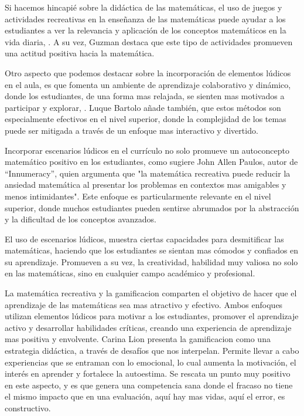 Si hacemos hincapié sobre la didáctica de las matemáticas, el uso de juegos y actividades recreativas en la enseñanza de las matemáticas puede ayudar a los estudiantes a ver la relevancia y aplicación de los conceptos matemáticos en la vida diaria, \textcite{guzman2000}. A su vez, Guzman destaca que este tipo de actividades promueven una actitud positiva hacia la matemática.

Otro aspecto que podemos destacar sobre la incorporación de elementos lúdicos en el aula, es que fomenta un ambiente de aprendizaje colaborativo y dinámico, donde los estudiantes, de una forma mas relajada, se sienten mas motivados a participar y explorar, \textcite{luque2015}. Luque Bartolo añade también, que estos métodos son especialmente efectivos en el nivel superior, donde la complejidad de los temas puede ser mitigada a través de un enfoque mas interactivo y divertido.

Incorporar escenarios lúdicos en el currículo no solo promueve un autoconcepto matemático positivo en los estudiantes, como sugiere John Allen Paulos, autor de ``Innumeracy'', quien argumenta que "la matemática recreativa puede reducir la ansiedad matemática al presentar los problemas en contextos mas amigables y menos intimidantes". Este enfoque es particularmente relevante en el nivel superior, donde muchos estudiantes pueden sentirse abrumados por la abstracción y la dificultad de los conceptos avanzados.

El uso de escenarios lúdicos, muestra ciertas capacidades para desmitificar las matemáticas, haciendo que los estudiantes se sientan mas cómodos y confiados en su aprendizaje. Promueven a su vez, la creatividad, habilidad muy valiosa no solo en las matemáticas, sino en cualquier campo académico y profesional.

La matemática recreativa y la gamificacion comparten el objetivo de hacer que el aprendizaje de las matemáticas sea mas atractivo y efectivo. Ambos enfoques utilizan elementos lúdicos para motivar a los estudiantes, promover el aprendizaje activo y desarrollar habilidades críticas, creando una experiencia de aprendizaje mas positiva y envolvente. Carina Lion presenta la gamificacion como una estrategia didáctica, a través de desafíos que nos interpelan. Permite llevar a cabo experiencias que se entraman con lo emocional, lo cual aumenta la motivación, el interés en aprender y fortalece la autoestima. Se rescata un punto muy positivo en este aspecto, y es que genera una competencia sana donde el fracaso no tiene el mismo impacto que en una evaluación, aquí hay mas vidas, aquí el error, es constructivo.

